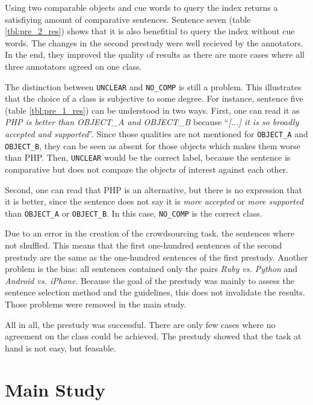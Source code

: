 Using two comparable objects and cue words to query the index returns a satisfiying amount of comparative sentences. Sentence seven (table \ref{tbl:pre_2_res}) shows that it is also benefitial to query the index without cue words. The changes in the second prestudy were well recieved by the annotators. In the end, they improved the quality of results as there are more cases where all three annotators agreed on one class.


The distinction between \texttt{UNCLEAR} and \texttt{NO\_COMP} is still a problem. This illustrates that the choice of a class is subjective to some degree. For instance, sentence five (table \ref{tbl:pre_1_res}) can be understood in two ways. First, one can read it as \emph{PHP is better than OBJECT\_A and OBJECT\_B} because \enquote{\emph{[...] it is so broadly accepted and supported}}. Since those qualities are not mentioned for \texttt{OBJECT\_A} and \texttt{OBJECT\_B}, they can be seen as absent for those objects which makes them worse than PHP. Then, \texttt{UNCLEAR} would be the correct label, because the sentence is comparative but does not compare the objects of interest against each other.

Second, one can read that PHP is an alternative, but there is no expression that it is better, since the sentence does not say it is \emph{more accepted} or \emph{more supported} than \texttt{OBJECT\_A} or \texttt{OBJECT\_B}. In this case, \texttt{NO\_COMP} is the correct class.
\hfill\newline

Due to an error in the creation of the crowdsourcing task, the sentences where not shuffled. This means that the first one-hundred sentences of the second prestudy are the same as the one-hundred sentences of the first prestudy. Another problem is the bias: all sentences contained only the pairs \emph{Ruby vs. Python} and \emph{Android vs. iPhone}. Because the goal of the prestudy was mainly to assess the sentence selection method and the guidelines, this does not invalidate the results. Those problems were removed in the main study.
\hfill\newline

All in all, the prestudy was successful. There are only few cases where no agreement on the class could be achieved. The prestudy showed that the task at hand is not easy, but feasable.

\newpage
\section{Main Study}
\label{sec:mainstudy}
